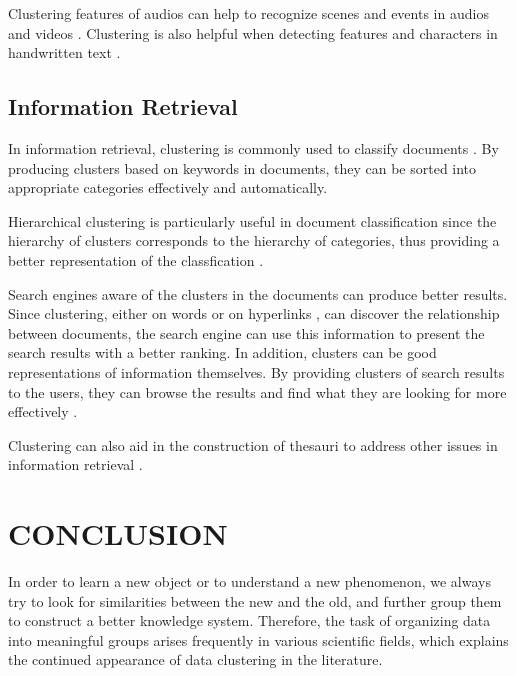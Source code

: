 \documentclass[conference]{IEEEtran}
\begin{document}
Clustering features of audios can help to recognize scenes and events in audios and videos \cite{clarkson1999unsupervised} \cite{liu1998audio}. Clustering is also helpful when detecting features and characters in handwritten text \cite{lu1995machine} \cite{yin2009handwritten}.

\subsection{Information Retrieval}
In information retrieval, clustering is commonly used to classify documents \cite{willett1988recent} \cite{steinbach2000comparison}. By producing clusters based on keywords in documents, they can be sorted into appropriate categories effectively and automatically.

Hierarchical clustering is particularly useful in document classification since the hierarchy of clusters corresponds to the hierarchy of categories, thus providing a better representation of the classfication \cite{willett1988recent}.

Search engines aware of the clusters in the documents can produce better results. Since clustering, either on words or on hyperlinks \cite{weiss1996hypursuit} \cite{brin1998anatomy}, can discover the relationship between documents, the search engine can use this information to present the search results with a better ranking. In addition, clusters can be good representations of information themselves. By providing clusters of search results to the users, they can browse the results and find what they are looking for more effectively \cite{cutting1992scatter}.

Clustering can also aid in the construction of thesauri to address other issues in information retrieval \cite{lin1998automatic}.

\section{CONCLUSION} \label{sec:Conclusion}

In order to learn a new object or to understand a new phenomenon, we always try to look for similarities between the new and the old, and further group them to construct a better knowledge system. Therefore, the task of organizing data into meaningful groups arises frequently in various scientific fields, which explains the continued appearance of data clustering in the literature. 
\end{document}
